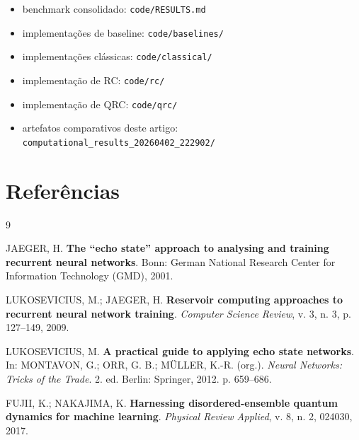 \documentclass[12pt]{article}
\providecommand{\tightlist}{%
              \setlength{\itemsep}{0pt}\setlength{\parskip}{0pt}}
\begin{document}
\begin{itemize}
\tightlist
\item
  benchmark consolidado: \texttt{code/RESULTS.md}
\item
  implementações de baseline: \texttt{code/baselines/}
\item
  implementações clássicas: \texttt{code/classical/}
\item
  implementação de RC: \texttt{code/rc/}
\item
  implementação de QRC: \texttt{code/qrc/}
\item
  artefatos comparativos deste artigo: \texttt{computational\_results\_20260402\_222902/}
\end{itemize}

\section{Referências}\label{referencias}

\begin{thebibliography}{9}

JAEGER, H. \textbf{The ``echo state'' approach to analysing and training recurrent neural networks}. Bonn: German National Research Center for Information Technology (GMD), 2001.

LUKOSEVICIUS, M.; JAEGER, H. \textbf{Reservoir computing approaches to recurrent neural network training}. \emph{Computer Science Review}, v. 3, n. 3, p. 127--149, 2009.

LUKOSEVICIUS, M. \textbf{A practical guide to applying echo state networks}. In: MONTAVON, G.; ORR, G. B.; MÜLLER, K.-R. (org.). \emph{Neural Networks: Tricks of the Trade}. 2. ed. Berlin: Springer, 2012. p. 659--686.

FUJII, K.; NAKAJIMA, K. \textbf{Harnessing disordered-ensemble quantum dynamics for machine learning}. \emph{Physical Review Applied}, v. 8, n. 2, 024030, 2017.

\end{thebibliography}

            
\end{document}

